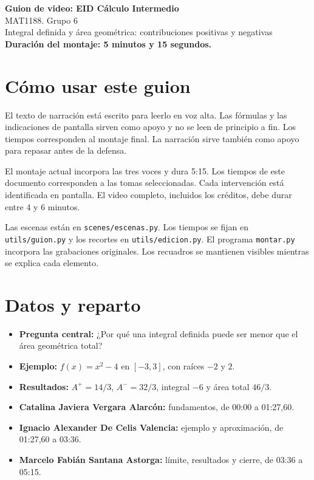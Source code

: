 \documentclass[11pt,a4paper]{article}
\begin{document}
\begin{center}
{\Large\textbf{Guion de video: EID Cálculo Intermedio}}\\[4pt]
{\large MAT1188. Grupo 6}\\[4pt]
Integral definida y área geométrica: contribuciones positivas y negativas\\[5pt]
\textbf{Duración del montaje: 5 minutos y 15 segundos.}
\end{center}

\section*{Cómo usar este guion}
El texto de narración está escrito para leerlo en voz alta. Las fórmulas y las indicaciones de pantalla sirven como apoyo y no se leen de principio a fin. Los tiempos corresponden al montaje final. La narración sirve también como apoyo para repasar antes de la defensa.

El montaje actual incorpora las tres voces y dura 5:15. Los tiempos de este documento corresponden a las tomas seleccionadas. Cada intervención está identificada en pantalla. El video completo, incluidos los créditos, debe durar entre 4 y 6 minutos.

Las escenas están en \texttt{scenes/escenas.py}. Los tiempos se fijan en \texttt{utils/guion.py} y los recortes en \texttt{utils/edicion.py}. El programa \texttt{montar.py} incorpora las grabaciones originales. Los recuadros se mantienen visibles mientras se explica cada elemento.

\section*{Datos y reparto}
\begin{itemize}[leftmargin=1.5em,itemsep=3pt]
\item \textbf{Pregunta central:} ¿Por qué una integral definida puede ser menor que el área geométrica total?
\item \textbf{Ejemplo:} $f(x)=x^2-4$ en $[-3,3]$, con raíces $-2$ y $2$.
\item \textbf{Resultados:} $A^+=14/3$, $A^-=32/3$, integral $-6$ y área total $46/3$.
\item \textbf{Catalina Javiera Vergara Alarcón:} fundamentos, de 00:00 a 01:27,60.
\item \textbf{Ignacio Alexander De Celis Valencia:} ejemplo y aproximación, de 01:27,60 a 03:36.
\item \textbf{Marcelo Fabián Santana Astorga:} límite, resultados y cierre, de 03:36 a 05:15.
\end{itemize}
\end{document}
